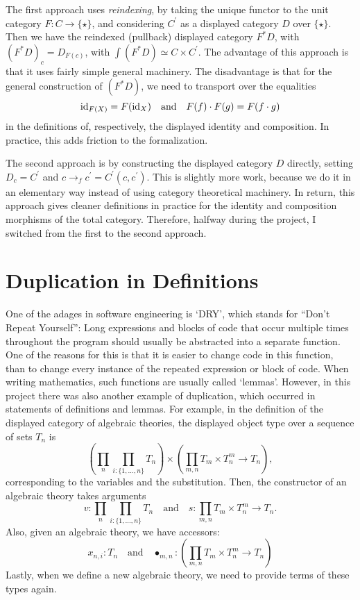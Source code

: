 The first approach uses \textit{reindexing}, by taking the unique functor to the unit category $ F : C \to \{ \star \} $, and considering $ C^\prime $ as a displayed category $ D $ over $ \{ \star \} $. Then we have the reindexed (pullback) displayed category $ F^* D $, with $ (F^* D)_c = D_{F(c)} $, with $ \int (F^* D) \simeq C \times C^\prime $. The advantage of this approach is that it uses fairly simple general machinery. The disadvantage is that for the general construction of $ (F^* D) $, we need to transport over the equalities
\[ \text{id}_{F(X)} = F(\text{id}_{X}) \quad \text{and} \quad F(f) \cdot F(g) = F(f \cdot g) \]
in the definitions of, respectively, the displayed identity and composition. In practice, this adds friction to the formalization.

The second approach is by constructing the displayed category $ D $ directly, setting $ D_c = C^\prime $ and $ c \to_f c^\prime = C^\prime(c, c^\prime) $. This is slightly more work, because we do it in an elementary way instead of using category theoretical machinery. In return, this approach gives cleaner definitions in practice for the identity and composition morphisms of the total category. Therefore, halfway during the project, I switched from the first to the second approach.

\section{Duplication in Definitions}
One of the adages in software engineering is `DRY', which stands for ``Don't Repeat Yourself'': Long expressions and blocks of code that occur multiple times throughout the program should usually be abstracted into a separate function. One of the reasons for this is that it is easier to change code in this function, than to change every instance of the repeated expression or block of code. When writing mathematics, such functions are usually called `lemmas'. However, in this project there was also another example of duplication, which occurred in statements of definitions and lemmas. For example, in the definition of the displayed category of algebraic theories, the displayed object type over a sequence of sets $ T_n $ is
\[ \left(\prod_n \prod_{i : \{ 1, \dots, n \}} T_n \right) \times \left( \prod_{m, n} T_m \times T_n^m \to T_n \right), \]
corresponding to the variables and the substitution. Then, the constructor of an algebraic theory takes arguments
\[ v : \prod_n \prod_{i : \{ 1, \dots, n \}} T_n \quad \text{and} \quad s : \prod_{m, n} T_m \times T_n^m \to T_n. \]
Also, given an algebraic theory, we have accessors:
\[ x_{n, i} : T_n \quad \text{and} \quad \bullet_{m, n} : (\prod_{m, n} T_m \times T_n^m \to T_n) \]
Lastly, when we define a new algebraic theory, we need to provide terms of these types again.

